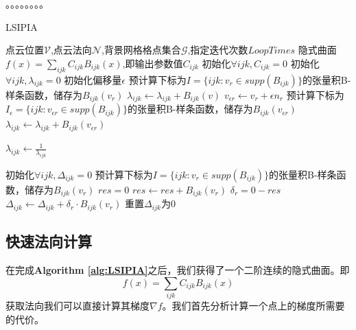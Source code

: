 。。。。。。。。
\begin{algorithm}
    \caption{LSIPIA}
    \label{alg:LSIPIA}
    \begin{algorithmic}[1]
    \Require 点云位置$\mathcal{V}$,点云法向$\mathcal{N}$,背景网格格点集合$\mathcal{G}$,指定迭代次数$LoopTimes$
    \Ensure 隐式曲面$f(x) = \sum_{ijk} C_{ijk}B_{ijk}(x)$,即输出参数值$C_{ijk}$
    \State 初始化$\forall ijk,C_{ijk} = 0$
    \State 初始化$\forall ijk,\lambda_{ijk} = 0$
    \State 初始化偏移量$\epsilon$
        \State 预计算下标为$I = \{ijk : v_r \in supp(B_{ijk})\}$的张量积B-样条函数，储存为$B_{ijk}(v_r)$
            \State $\lambda_{ijk} \leftarrow \lambda_{ijk} + B_{ijk}(v)$
        \EndFor
        \State $v_{\epsilon r} \leftarrow v_r + \epsilon n_r$
        \State 预计算下标为$I_{\epsilon} = \{ijk : v_{\epsilon r} \in supp(B_{ijk})\}$的张量积B-样条函数，储存为$B_{ijk}(v_{\epsilon r})$
            \State $\lambda_{ijk} \leftarrow \lambda_{ijk} + B_{ijk}(v_{\epsilon r})$
        \EndFor
    \EndFor
    
            \State $\lambda_{ijk}\leftarrow \frac{1}{\lambda_{ijk}}$
        \EndIf
    \EndFor

    \State 初始化$\forall ijk,\Delta_{ijk} = 0$
            \State 预计算下标为$I = \{ijk : v_r \in supp(B_{ijk})\}$的张量积B-样条函数，储存为$B_{ijk}(v_r)$
            \State $res = 0$
                \State $res \leftarrow res + B_{ijk}(v_r)$ 
            \EndFor
            \State $\delta_r = 0 - res$
                \State $\Delta_{ijk}\leftarrow \Delta_{ijk} + \delta_r \cdot B_{ijk}(v_r)$ 
                \State 重置$\Delta_{ijk}$为0
            \EndFor
        \EndFor
    \EndFor

    \end{algorithmic}
\end{algorithm}

\subsection{快速法向计算}
在完成\textbf{Algorithm \ref{alg:LSIPIA}}之后，我们获得了一个二阶连续的隐式曲面。即
\begin{equation}
    f(x) = \sum_{ijk} C_{ijk}B_{ijk}(x)
\end{equation}
获取法向我们可以直接计算其梯度$\nabla f$。我们首先分析计算一个点上的梯度所需要的代价。

